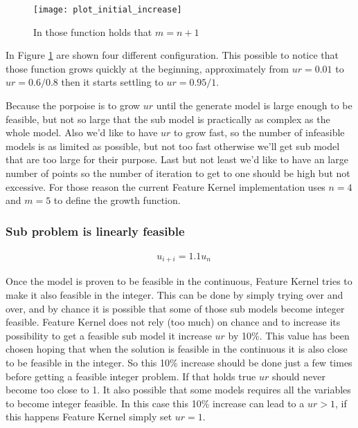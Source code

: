     \begin{figure}[H]
        \centering
        \texttt{[image: plot\_initial\_increase]}
        \caption{In those function holds that $m = n+1$}\label{fig:inf-grow-plot}
    \end{figure}
    
    In Figure \ref{fig:inf-grow-plot} are shown four different configuration. This possible to notice that those function
    grows quickly at the beginning, approximately from $ur = 0.01$ to $ur = 0.6 / 0.8$ then it starts settling
    to $ur = 0.95 / 1$.

    
    Because the porpoise is to grow $ur$ until the generate model is large enough to be feasible, but not so large 
    that the sub model is practically as complex as the whole model. Also we'd like to have $ur$ to grow fast, so the number
    of infeasible models is as limited as possible, but not too fast otherwise we'll get sub model that are too large for their
    purpose. Last but not least we'd like to have an large number of points so the number of iteration to get to one should be high 
    but not excessive.
    For those reason the current Feature Kernel implementation uses $n = 4$ and $m = 5$ to define the growth function.

    


\subsubsection*{Sub problem is linearly feasible}
    \begin{align}
        &u_{i+i} = 1.1 u_{n} \label{eq:ur-lin-fease-grow}
    \end{align}

    Once the model is proven to be feasible in the continuous, Feature Kernel tries to make it also feasible in the 
    integer. This can be done by simply trying over and over, and by chance it is possible that some of those sub models
    become integer feasible. Feature Kernel does not rely (too much) on chance and to increase its possibility to get 
    a feasible sub model it increase $ur$ by 10\%. This value has been chosen hoping that when the solution is feasible 
    in the continuous it is also close to be feasible in the integer. So this 10\% increase should be done just a few times
    before getting a feasible integer problem. If that holds true $ur$ should never become too close to 1.  
    It also possible that some models requires all the variables to become integer feasible. In this case this 10\% increase 
    can lead to a $ur > 1$, if this happens Feature Kernel simply set $ur = 1$.

